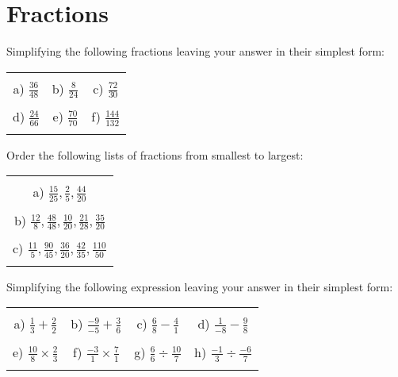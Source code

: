 \documentclass[12pt]{article}
\begin{document}
\section{Fractions}
Simplifying the following fractions leaving your answer in their simplest form:
\begin{table}[h!]
\centering
\begin{tabular}{c c c}
\hspace{2cm} & \hspace{6cm} & \hspace{4cm}\\
a) $\frac{36}{48}$ & b) $\frac{8}{24}$ & c) $\frac{72}{30}$\\ \\
d) $\frac{24}{66}$ & e) $\frac{70}{70}$ & f) $\frac{144}{132}$\\ \\
\end{tabular}
\end{table}
\newline
Order the following lists of fractions from smallest to largest:
\begin{table}[h!]
\centering
\begin{tabular}{c}
\hspace{4cm}\\
a) $\frac{15}{25}, \frac{2}{5}, \frac{44}{20}$\\ \\
b) $\frac{12}{8}, \frac{48}{48}, \frac{10}{20}, \frac{21}{28}, \frac{35}{20}$\\ \\
c) $\frac{11}{5}, \frac{90}{45}, \frac{36}{20}, \frac{42}{35}, \frac{110}{50}$\\ \\
\end{tabular}
\end{table}
\newline
Simplifying the following expression leaving your answer in their simplest form:
\begin{table}[h!]
\centering
\begin{tabular}{c c c c}
\hspace{4cm} & \hspace{4cm} & \hspace{4cm} & \hspace{4cm}\\
a) $\frac{{1}}{{3}} + \frac{{2}}{{2}}$ & b) $\frac{{-9}}{{-5}} + \frac{{3}}{{6}}$ & c) $\frac{{6}}{{8}} - \frac{{4}}{{1}}$ & d) $\frac{{1}}{{-8}} - \frac{{9}}{{8}}$ \\ \\
e) $\frac{{10}}{{8}}\times\frac{{2}}{{3}}$ & f) $\frac{{-3}}{{1}}\times\frac{{7}}{{1}}$ & g) $\frac{{6}}{{6}}\div\frac{{10}}{{7}}$ & h) $\frac{{-1}}{{3}}\div\frac{{-6}}{{7}}$ \\ \\
\end{tabular}
\end{table}
\newline
\end{document}

